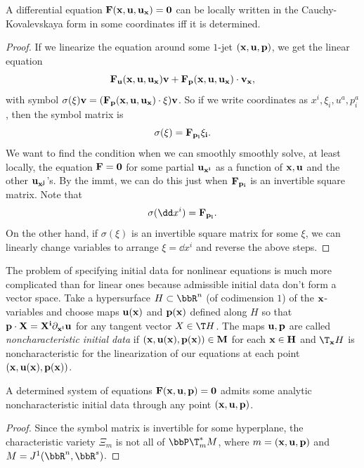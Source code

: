\begin{lem}
    A differential equation $\bf{F}(\bf{x},\bf{u},\bf{u}_{\bf x})=0$ can be locally written in the Cauchy-Kovalevskaya form in some coordinates iff it is determined.
\end{lem}
\begin{proof}
    If we linearize the equation around some $1$-jet $(\bf{x},\bf{u},\bf{p})$, we get the linear equation 
    \[\bf{F}_{\bf{u}}(\bf{x},\bf{u},\bf{u}_{\bf x})\bf{v}+\bf{F}_{\bf p}(\bf{x},\bf{u},\bf{u}_{\bf x})\cdot \bf{v}_{\bf x},\]
    with symbol $\sigma(\xi)\bf{v}=(\bf{F}_{\bf p}(\bf{x},\bf{u},\bf{u}_{\bf x})\cdot \xi) \bf{v}$. So if we write coordinates as $x^i,\xi_i,u^a,p^a_i$, then the symbol matrix is 
    \[\sigma(\xi)=\bf{F}_{p_i}\xi_i.\]
    We want to find the condition when we can smoothly smoothly solve, at least locally, the equation $\bf{F}=0$ for some partial $\bf{u}_{x^i}$ as a function of $\bf{x},\bf{u}$ and the other $\bf{u}_{x^j}$'s. By the \gls{immt}, we can do this just when $\bf{F}_{p_i}$ is an invertible square matrix. Note that 
    \[\sigma(\dd x^i)=\bf{F}_{p_i}.\]
    On the other hand, if $\sigma(\xi)$ is an invertible square matrix for some $\xi$, we can linearly change variables to arrange $\xi=\dd x^i$ and reverse the above steps.
\end{proof}

The problem of specifying initial data for nonlinear equations is much more complicated than for linear ones because admissible initial data don't form a vector space. Take a hypersurface $H\subset\bbR^n$ (of codimension $1$) of the $\bf{x}$-variables and choose maps $\bf{u}(\bf{x})$ and $\bf{p}(\bf{x})$ defined along $H$ so that $\bf{p}\cdot X=X^i\partial_{x^i}\bf{u}$ for any tangent vector $X\in \T H$. The maps $\bf{u},\bf{p}$ are called \emph{noncharacteristic initial data} if $(\bf{x},\bf{u}(\bf{x}),\bf{p}(\bf{x}))\in M$ for each $\bf{x}\in H$ and $\T_{\bf{x}}H$ is noncharacteristic for the linearization of our equations at each point $(\bf{x},\bf{u}(\bf{x}),\bf{p}(\bf{x}))$.

\begin{lem}
    A determined system of equations $\bf{F}(\bf{x},\bf{u},\bf{p})=0$ admits some analytic noncharacteristic initial data through any point $(\bf{x},\bf{u},\bf{p})$.
\end{lem}
\begin{proof}
    Since the symbol matrix is invertible for some hyperplane, the characteristic variety $\Xi_m$ is not all of $\bbP \T^\ast_m M$, where $m=(\bf{x},\bf{u},\bf{p})$ and $M=J^1(\bbR^n,\bbR^s)$.
\end{proof}

